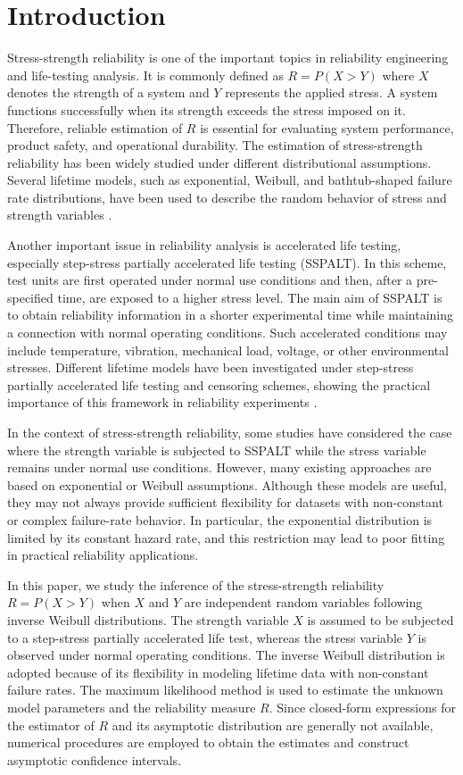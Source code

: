 \documentclass[twoside]{article}
\begin{document}
\section{Introduction}
Stress-strength reliability is one of the important topics in reliability engineering and life-testing analysis. It is commonly defined as $ R=P(X>Y) $
where $X$ denotes the strength of a system and $Y$ represents the applied stress. A system functions successfully when its strength exceeds the stress imposed on it. Therefore, reliable estimation of $R$ is essential for evaluating system performance, product safety, and operational durability. The estimation of stress-strength reliability has been widely studied under different distributional assumptions. Several lifetime models, such as exponential, Weibull, and bathtub-shaped failure rate distributions, have been used to describe the random behavior of stress and strength variables \citep{ElSagheer:2015}.

Another important issue in reliability analysis is accelerated life testing, especially step-stress partially accelerated life testing (SSPALT). In this scheme, test units are first operated under normal use conditions and then, after a pre-specified time, are exposed to a higher stress level. The main aim of SSPALT is to obtain reliability information in a shorter experimental time while maintaining a connection with normal operating conditions. Such accelerated conditions may include temperature, vibration, mechanical load, voltage, or other environmental stresses. Different lifetime models have been investigated under step-stress partially accelerated life testing and censoring schemes, showing the practical importance of this framework in reliability experiments \citep{Sarhan:2015,Sarhan:2023}.

In the context of stress-strength reliability, some studies have considered the case where the strength variable is subjected to SSPALT while the stress variable remains under normal use conditions. However, many existing approaches are based on exponential or Weibull assumptions. Although these models are useful, they may not always provide sufficient flexibility for datasets with non-constant or complex failure-rate behavior. In particular, the exponential distribution is limited by its constant hazard rate, and this restriction may lead to poor fitting in practical reliability applications.

In this paper, we study the inference of the stress-strength reliability $R=P(X>Y)$ when $X$ and $Y$ are independent random variables following inverse Weibull distributions. The strength variable $X$ is assumed to be subjected to a step-stress partially accelerated life test, whereas the stress variable $Y$ is observed under normal operating conditions. The inverse Weibull distribution is adopted because of its flexibility in modeling lifetime data with non-constant failure rates. The maximum likelihood method is used to estimate the unknown model parameters and the reliability measure $R$. Since closed-form expressions for the estimator of $R$ and its asymptotic distribution are generally not available, numerical procedures are employed to obtain the estimates and construct asymptotic confidence intervals.
\vspace{-0.5cm}
\end{document}
